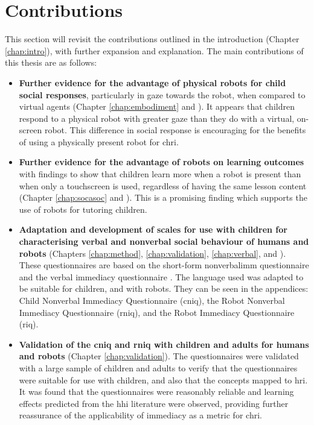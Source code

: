 \section{Contributions}\label{sec:conc-contribution}
This section will revisit the contributions outlined in the introduction (Chapter \ref{chap:intro}), with further expansion and explanation. The main contributions of this thesis are as follows:

\begin{itemize}

	\item \textbf{Further evidence for the advantage of physical robots for child social responses}, particularly in gaze towards the robot, when compared to virtual agents (Chapter \ref{chap:embodiment} and \citealp{kennedy2015comparing}). It appears that children respond to a physical robot with greater gaze than they do with a virtual, on-screen robot. This difference in social response is encouraging for the benefits of using a physically present robot for \acrshort{chri}.
	
	\item \textbf{Further evidence for the advantage of robots on \gls{learning} outcomes} with findings to show that children learn more when a robot is present than when only a touchscreen is used, regardless of having the same lesson content (Chapter \ref{chap:socasoc} and \citealp{kennedy2015robot}). This is a promising finding which supports the use of robots for tutoring children.
	
	\item \textbf{Adaptation and development of scales for use with children for characterising verbal and nonverbal social behaviour of humans and robots} (Chapters \ref{chap:method}, \ref{chap:validation}, \ref{chap:verbal}, and \citealp{kennedy2016social}). These questionnaires are based on the short-form \gls{nonverbalimm} questionnaire \citep{richmond2003development} and the verbal immediacy questionnaire \citep{gorham1988relationship}. The language used was adapted to be suitable for children, and with robots. They can be seen in the appendices: Child Nonverbal Immediacy Questionnaire (\acrshort{cniq}), the Robot Nonverbal Immediacy Questionnaire (\acrshort{rniq}), and the Robot Immediacy Questionnaire (\acrshort{riq}).
	
	\item \textbf{Validation of the \acrshort{cniq} and \acrshort{rniq} with children and adults for humans and robots} (Chapter \ref{chap:validation}). The questionnaires were validated with a large sample of children and adults to verify that the questionnaires were suitable for use with children, and also that the concepts mapped to \acrshort{hri}. It was found that the questionnaires were reasonably reliable and \gls{learning} effects predicted from the \acrshort{hhi} literature were observed, providing further reassurance of the applicability of immediacy as a metric for \acrshort{chri}.
		

\end{itemize}
